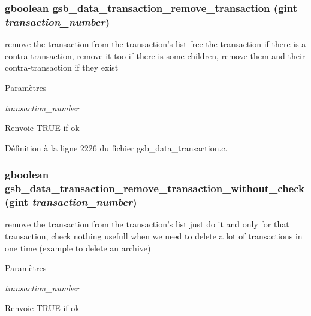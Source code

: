\subsubsection[{gsb\_\-data\_\-transaction\_\-remove\_\-transaction}]{\setlength{\rightskip}{0pt plus 5cm}gboolean gsb\_\-data\_\-transaction\_\-remove\_\-transaction (gint {\em transaction\_\-number})}\label{gsb__data__transaction_8h_aef8db2326b8eb8bce54ee20df4f49c1e}
remove the transaction from the transaction's list free the transaction if there is a contra-\/transaction, remove it too if there is some children, remove them and their contra-\/transaction if they exist


\begin{DoxyParams}{Paramètres}
\item[{\em transaction\_\-number}]\end{DoxyParams}
\begin{DoxyReturn}{Renvoie}
TRUE if ok 
\end{DoxyReturn}


Définition à la ligne 2226 du fichier gsb\_\-data\_\-transaction.c.

\subsubsection[{gsb\_\-data\_\-transaction\_\-remove\_\-transaction\_\-without\_\-check}]{\setlength{\rightskip}{0pt plus 5cm}gboolean gsb\_\-data\_\-transaction\_\-remove\_\-transaction\_\-without\_\-check (gint {\em transaction\_\-number})}\label{gsb__data__transaction_8h_a29e77fb492430ce1ddc9fad9ba9dab96}
remove the transaction from the transaction's list just do it and only for that transaction, check nothing usefull when we need to delete a lot of transactions in one time (example to delete an archive)


\begin{DoxyParams}{Paramètres}
\item[{\em transaction\_\-number}]\end{DoxyParams}
\begin{DoxyReturn}{Renvoie}
TRUE if ok 
\end{DoxyReturn}


